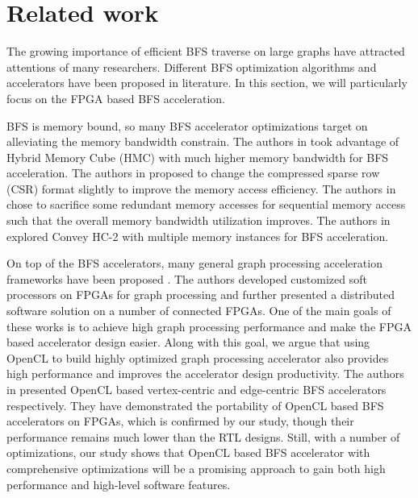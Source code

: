 \section{Related work} \label{sec:relatedwork}
The growing importance of efficient BFS traverse on large graphs 
have attracted attentions of many researchers. Different BFS 
optimization algorithms and accelerators have been proposed in 
literature. In this section, we will particularly focus on the 
FPGA based BFS acceleration. 

BFS is memory bound, so many BFS accelerator optimizations 
target on alleviating the memory bandwidth constrain. The authors in 
\cite{zhang2017boosting, khoram2018accelerating} 
took advantage of Hybrid Memory Cube (HMC) with much higher memory 
bandwidth for BFS acceleration. The authors in \cite{attia2014cygraph} 
proposed to change the compressed sparse row (CSR) format slightly to 
improve the memory access efficiency. The authors in \cite{umuroglu2015hybrid} 
chose to sacrifice some redundant memory accesses for sequential memory 
access such that the overall memory bandwidth utilization improves.
The authors in \cite{attia2014cygraph, betkaoui2012reconfigurable} explored 
Convey HC-2 \cite{bakos2010high} with multiple memory instances for BFS acceleration. 

On top of the BFS accelerators, many general graph processing acceleration frameworks 
have been proposed \cite{engelhardt2016gravf, jun2018grafboost, yao2018efficient, 
oguntebi2016graphops, Dai2017foregraph, dai2016fpgp, nina2018performance, engelhardt2017towards}. The authors \cite{kapre2015custom, 
wang2010message} developed customized soft processors on FPGAs for graph processing and further 
presented a distributed software solution on a number of connected FPGAs.
One of the main goals of these works is to achieve high graph processing performance and make the 
FPGA based accelerator design easier. Along with this goal, we argue that using OpenCL to build highly 
optimized graph processing accelerator also provides high performance and improves the 
accelerator design productivity. The authors in \cite{gautier2016spector, chen_fpl2019} 
presented OpenCL based vertex-centric and edge-centric BFS accelerators 
respectively. They have demonstrated the portability of OpenCL based BFS 
accelerators on FPGAs, which is confirmed by our study,
though their performance remains much lower than the RTL designs. 
Still, with a number of optimizations, our study 
shows that OpenCL based BFS accelerator with comprehensive optimizations will be a promising approach to 
gain both high performance and high-level software features.
